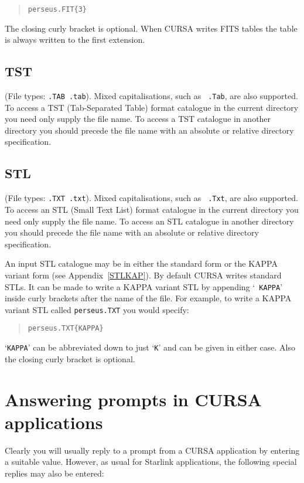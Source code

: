 \documentclass[twoside,11pt]{article}
\newcommand{\xlabel}[1]{}
\renewcommand{\_}{\texttt{\symbol{95}}}
\begin{document}
\begin{verse}
{\tt perseus.FIT\{3\} }
\end{verse}

The closing curly bracket is optional. When CURSA writes FITS tables
the table is always written to the first extension.

\subsection{TST}

(File types: {\tt .TAB .tab}). Mixed capitalisations, such as {\tt
.Tab}, are also supported.  To access a TST (Tab-Separated Table) format
catalogue in the current directory you need only supply the file name.
To access a TST catalogue in another directory you should precede the
file name with an absolute or relative directory specification.

\subsection{STL}

(File types: {\tt .TXT .txt}). Mixed capitalisations, such as {\tt
.Txt}, are also supported.  To access an STL (Small Text List) format
catalogue in the current directory you need only supply the file name.
To access an STL catalogue in another directory you should precede the
file name with an absolute or relative directory specification.

An input STL catalogue may be in either the standard form or the KAPPA
variant form (see Appendix~\ref{STLKAP}).  By default CURSA writes standard
STLs.  It can be made to write a KAPPA variant STL by appending `{\tt
KAPPA}' inside curly brackets after the name of the file.  For example,
to write a KAPPA variant STL called {\tt perseus.TXT} you would specify:

\begin{verse}
{\tt perseus.TXT\{KAPPA\} }
\end{verse}

`{\tt KAPPA}' can be abbreviated down to just `{\tt K}' and can be given
in either case.  Also the closing curly bracket is optional.


\section{\xlabel{PROMPTS}\label{PROMPTS}Answering prompts in CURSA
applications}

Clearly you will usually reply to a prompt from a CURSA application by
entering a suitable value. However, as usual for Starlink applications,
the following special replies may also be entered:
\end{document}
